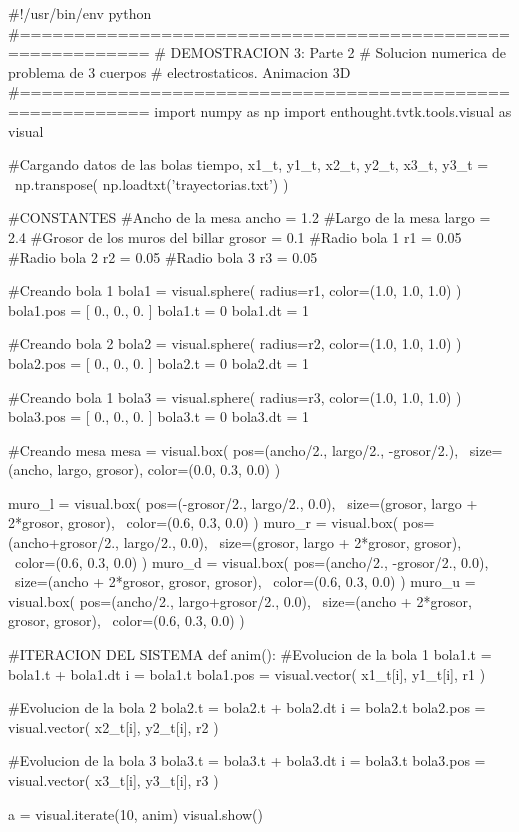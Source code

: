 \begin{listing}[style=python]
#!/usr/bin/env python
#==========================================================
# DEMOSTRACION 3: Parte 2
# Solucion numerica de problema de 3 cuerpos 
# electrostaticos. Animacion 3D
#==========================================================
import numpy as np
import enthought.tvtk.tools.visual as visual

#Cargando datos de las bolas
tiempo, x1_t, y1_t, x2_t, y2_t, x3_t, y3_t = \
np.transpose( np.loadtxt('trayectorias.txt') )

#CONSTANTES
#Ancho de la mesa
ancho = 1.2
#Largo de la mesa
largo = 2.4
#Grosor de los muros del billar
grosor = 0.1
#Radio bola 1
r1 = 0.05
#Radio bola 2
r2 = 0.05
#Radio bola 3
r3 = 0.05

#Creando bola 1
bola1 = visual.sphere( radius=r1, color=(1.0, 1.0, 1.0) )
bola1.pos = [ 0., 0., 0. ]
bola1.t = 0
bola1.dt = 1

#Creando bola 2
bola2 = visual.sphere( radius=r2, color=(1.0, 1.0, 1.0) )
bola2.pos = [ 0., 0., 0. ]
bola2.t = 0
bola2.dt = 1

#Creando bola 1
bola3 = visual.sphere( radius=r3, color=(1.0, 1.0, 1.0) )
bola3.pos = [ 0., 0., 0. ]
bola3.t = 0
bola3.dt = 1

#Creando mesa
mesa = visual.box( pos=(ancho/2., largo/2., -grosor/2.), \
size=(ancho, largo, grosor), color=(0.0, 0.3, 0.0) )

muro_l = visual.box( pos=(-grosor/2., largo/2., 0.0), \
size=(grosor, largo + 2*grosor, grosor), \
color=(0.6, 0.3, 0.0) )
muro_r = visual.box( pos=(ancho+grosor/2., largo/2., 0.0), \
size=(grosor, largo + 2*grosor, grosor), \
color=(0.6, 0.3, 0.0) )
muro_d = visual.box( pos=(ancho/2., -grosor/2., 0.0), \
size=(ancho + 2*grosor, grosor, grosor), \
color=(0.6, 0.3, 0.0) )
muro_u = visual.box( pos=(ancho/2., largo+grosor/2., 0.0), \
size=(ancho + 2*grosor, grosor, grosor), \
color=(0.6, 0.3, 0.0) )


#ITERACION DEL SISTEMA
def anim(): 
    #Evolucion de la bola 1
    bola1.t = bola1.t + bola1.dt
    i = bola1.t
    bola1.pos = visual.vector( x1_t[i], y1_t[i], r1 )
    
    #Evolucion de la bola 2
    bola2.t = bola2.t + bola2.dt
    i = bola2.t
    bola2.pos = visual.vector( x2_t[i], y2_t[i], r2 )
    
    #Evolucion de la bola 3
    bola3.t = bola3.t + bola3.dt
    i = bola3.t
    bola3.pos = visual.vector( x3_t[i], y3_t[i], r3 )
    
a = visual.iterate(10, anim)
visual.show()
\end{listing}


